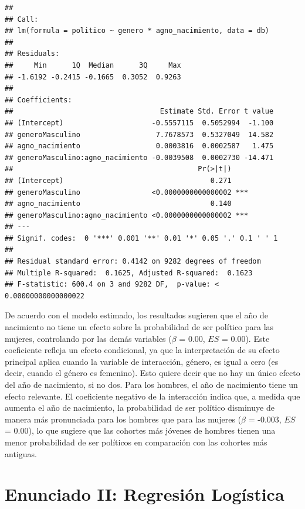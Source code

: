 \documentclass[
  12pt,
  a4paper,
]{article}
\begin{document}
\begin{verbatim}
## 
## Call:
## lm(formula = politico ~ genero * agno_nacimiento, data = db)
## 
## Residuals:
##     Min      1Q  Median      3Q     Max 
## -1.6192 -0.2415 -0.1665  0.3052  0.9263 
## 
## Coefficients:
##                                   Estimate Std. Error t value
## (Intercept)                     -0.5557115  0.5052994  -1.100
## generoMasculino                  7.7678573  0.5327049  14.582
## agno_nacimiento                  0.0003816  0.0002587   1.475
## generoMasculino:agno_nacimiento -0.0039508  0.0002730 -14.471
##                                            Pr(>|t|)    
## (Intercept)                                   0.271    
## generoMasculino                 <0.0000000000000002 ***
## agno_nacimiento                               0.140    
## generoMasculino:agno_nacimiento <0.0000000000000002 ***
## ---
## Signif. codes:  0 '***' 0.001 '**' 0.01 '*' 0.05 '.' 0.1 ' ' 1
## 
## Residual standard error: 0.4142 on 9282 degrees of freedom
## Multiple R-squared:  0.1625, Adjusted R-squared:  0.1623 
## F-statistic: 600.4 on 3 and 9282 DF,  p-value: < 0.00000000000000022
\end{verbatim}

De acuerdo con el modelo estimado, los resultados sugieren que el año de nacimiento no tiene un efecto sobre la probabilidad de ser político para las mujeres, controlando por las demás variables (\(\beta\) = 0.00, \(ES\) = 0.00). Este coeficiente refleja un efecto condicional, ya que la interpretación de su efecto principal aplica cuando la variable de interacción, género, es igual a cero (es decir, cuando el género es femenino). Esto quiere decir que no hay un único efecto del año de nacimiento, si no dos. Para los hombres, el año de nacimiento tiene un efecto relevante. El coeficiente negativo de la interacción indica que, a medida que aumenta el año de nacimiento, la probabilidad de ser político disminuye de manera más pronunciada para los hombres que para las mujeres (\(\beta\) = -0.003, \(ES\) = 0.00), lo que sugiere que las cohortes más jóvenes de hombres tienen una menor probabilidad de ser políticos en comparación con las cohortes más antiguas.

\hypertarget{enunciado-ii-regresiuxf3n-loguxedstica}{%
\section{Enunciado II: Regresión Logística}\label{enunciado-ii-regresiuxf3n-loguxedstica}}
\end{document}
